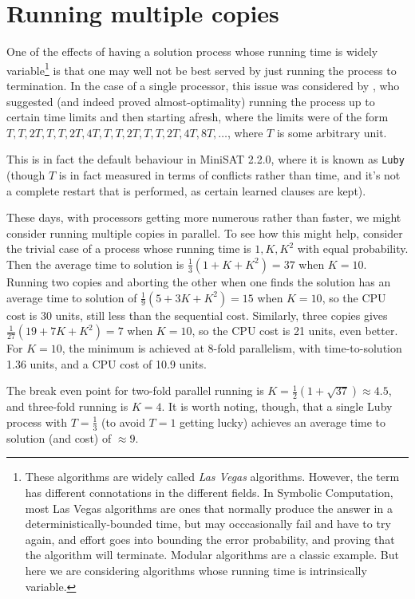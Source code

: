 \documentclass{easychair}
\begin{document}
\section{Running multiple copies}
One of the effects of having a solution process whose running time is widely variable\footnote{These algorithms are widely called \emph{Las Vegas} algorithms. However, the term has different connotations in the different fields. In Symbolic Computation, most Las Vegas algorithms are ones that normally produce the answer in a deterministically-bounded time, but may occcasionally fail and have to try again, and effort goes into bounding the error probability, and proving that the algorithm will terminate. Modular algorithms are a classic example. But here we are considering algorithms whose running time is intrinsically variable.} is that one may well not be best served by just running the process to termination.  In the case of a single processor, this issue was considered by \cite{Lubyetal1993}, who suggested (and indeed proved almost-optimality) running the process up to certain time limits and then starting afresh, where the limits were  of the form $T,T,2T,T,T,2T,4T,T,T,2T,T,T,2T,4T,8T,\ldots$, where $T$ is some arbitrary unit.
\par
This is in fact the default behaviour in MiniSAT 2.2.0, where it is known as \verb+Luby+ (though $T$ is in fact measured in terms of conflicts rather than time, and it's not a complete restart that is performed, as certain learned clauses are kept). 
\par
These days, with processors getting more numerous rather than faster, we might consider running multiple copies in parallel. To see how this might help, consider the trivial case of a process whose running time is $1,K,K^2$ with equal probability. Then the average time to solution is $\frac13(1+K+K^2)=37$ when $K=10$. Running two copies and aborting the other when one finds the solution has an average time to solution of $\frac19(5+3K+K^2)=15$ when $K=10$, so the CPU cost is 30 units, still less than the sequential cost.
Similarly, three copies gives $\frac1{27}(19+7K+K^2)=7$ when $K=10$, so the CPU cost is 21 units, even better.  For $K=10$, the minimum is achieved at 8-fold parallelism, with time-to-solution 1.36 units, and a CPU cost of 10.9 units.

The break even point for two-fold parallel running is $K=\frac12\left(1+\sqrt{37}\right)\approx4.5$, and three-fold running is $K=4$. It is worth noting, though, that a single Luby process with $T=\frac13$ (to avoid $T=1$ getting lucky) achieves an average time to solution (and cost) of $\approx 9$.
\end{document}
